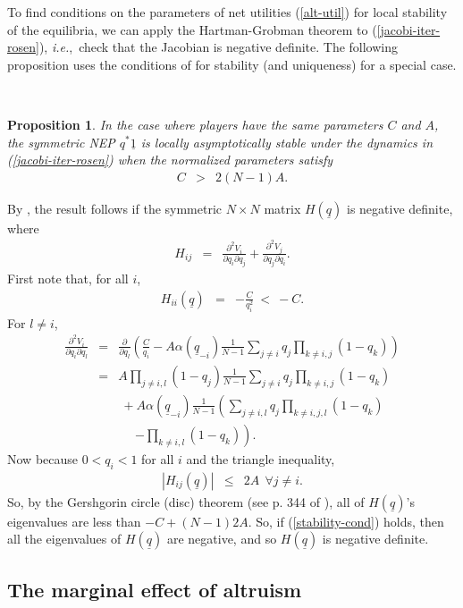 \documentclass[12pt,onecolumn,draftcls]{IEEEtran}
\newtheorem{proposition}[theorem]{Proposition}
\newcommand{\qstar}{{q^*}}
\newcommand{\ie}{{\em i.e.},~}
\newcommand{\uq}{\underline{q}}
\newcommand{\uone}{\underline{1}}
\newcommand{\beqa}{\begin{eqnarray*}}
\newcommand{\eeqa}{\end{eqnarray*}}
\newcommand{\be}{\begin{eqnarray}}
\newcommand{\ee}{\end{eqnarray}}
\begin{document}
To find conditions on the parameters of net utilities (\ref{alt-util}) for
local stability of the equilibria, we can apply the Hartman-Grobman theorem
\cite{Perko01}
to (\ref{jacobi-iter-rosen}), \ie check that the Jacobian is negative
definite.  The following proposition uses the conditions of \cite{Rosen65}
for stability (and uniqueness) for a special case.

~\\

\begin{proposition}\label{stability-claim}
In the case where players have the same parameters $C$ and $A$, the
symmetric NEP $\qstar \uone$ is locally asymptotically stable under the
dynamics in (\ref{jacobi-iter-rosen}) when the normalized parameters satisfy
\be\label{stability-cond}
C & > & 2(N-1)A.
\ee
\end{proposition}

\begin{IEEEproof}
By \cite{Rosen65}, the result follows if
the symmetric $N\times N$ matrix $H(\uq)$ is negative
definite, where 
\beqa
H_{ij} & = &  
\frac{\partial^2 V_i}{\partial q_i\partial q_j}
+\frac{\partial^2 V_j}{\partial q_j\partial q_i}.
\eeqa
First note that, for all $i$, 
\beqa
H_{ii}(\uq) & = & -\frac{C}{q_i^2} ~<~ -C.
\eeqa
For $l\not= i$,
\beqa
\frac{\partial^2 V_i}{\partial q_i\partial q_l} 
& = & \frac{\partial}{\partial q_l} \left(\frac{C}{q_i}
-A\alpha(\uq_{-i})
\tfrac{1}{N-1}\sum_{j\not=i}
q_j\prod_{k\not =i,j } (1-q_k) 
\right)\\
& = &  
A\prod_{j\not =i,l } (1-q_j)
\tfrac{1}{N-1}\sum_{j\not=i}
q_j\prod_{k\not =i,j } (1-q_k) \\
&  & ~
+A\alpha(\uq_{-i})\tfrac{1}{N-1}\left(
\sum_{j\not = i,l} q_j
\prod_{k\not =i,j,l } (1-q_k)  \right.\\
& & ~~~~~~\left.
-\prod_{k\not =i,l } (1-q_k) 
\right).
\eeqa
Now because
$0<q_i<1$ for all $i$ and the triangle inequality,
\beqa
|H_{ij}(\uq)| & \leq  & 2A ~~ \forall j\not=i.
\eeqa
So, by the
Gershgorin circle (disc) theorem (see p. 344 of \cite{horn0}),
all of $H(\uq)$'s eigenvalues are less than $-C + (N-1)2A$.
So, if (\ref{stability-cond}) holds, then
all the eigenvalues of $H(\uq)$ are negative,
and so $H(\uq)$  is  negative definite.
\end{IEEEproof}





\subsection{The marginal effect of altruism}
\end{document}
